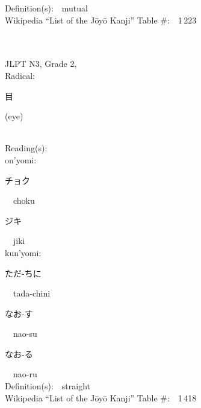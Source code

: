 \begin{multicols}{2}
Definition(s):\ \ mutual \\
Wikipedia ``List of the J\=oy\=o Kanji'' Table \#:\ \ 1\,223 \\
\ \ \\
{\fontsize{34pt}{40pt}  }\ \ \\  %
{JLPT N3, Grade 2, \\Radical:\ \ {\begin{CJK}{UTF8}{min} 目 \end{CJK}} (eye) } \\
Reading(s):\ \ \\
{\hspace*{1em}}on'yomi:\ \ \\
{\hspace*{2em}}{\begin{CJK}{UTF8}{min} チョク \end{CJK}}\ \ choku\ \ \\
{\hspace*{2em}}{\begin{CJK}{UTF8}{min} ジキ \end{CJK}}\ \ jiki\ \ \\
{\hspace*{1em}}kun'yomi:\ \ \\
{\hspace*{2em}}{\begin{CJK}{UTF8}{min} ただ-ちに \end{CJK}}\ \ tada-chini\ \ \\
{\hspace*{2em}}{\begin{CJK}{UTF8}{min} なお-す \end{CJK}}\ \ nao-su\ \ \\
{\hspace*{2em}}{\begin{CJK}{UTF8}{min} なお-る \end{CJK}}\ \ nao-ru\ \ \\
Definition(s):\ \ straight \\
Wikipedia ``List of the J\=oy\=o Kanji'' Table \#:\ \ 1\,418 \\
\ \ \\
{\fontsize{34pt}{40pt}  }\ \ \\  %

\end{multicols}
